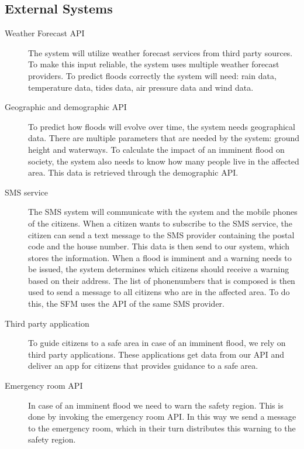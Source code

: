 \subsection{External Systems}
\label{subsec:external-system}
\begin{description}
	\item[Weather Forecast API] The system will utilize weather forecast services from third party sources. To make this input reliable, the system uses multiple weather forecast providers. To predict floods correctly the system will need: rain data, temperature data, tides data, air pressure data and wind data.
	\item[Geographic and demographic API] To predict how floods will evolve over time, the system needs geographical data. There are multiple parameters that are needed by the system: ground height and waterways. To calculate the impact of an imminent flood on society, the system also needs to know how many people live in the affected area. This data is retrieved through the demographic API.
	\item[SMS service] The SMS system will communicate with the system and the mobile phones of the citizens. When a citizen wants to subscribe to the SMS service, the citizen can send a text message to the SMS provider containing the postal code and the house number. This data is then send to our system, which stores the information. When a flood is imminent and a warning needs to be issued, the system determines which citizens should receive a warning based on their address. The list of phonenumbers that is composed is then used to send a message to all citizens who are in the affected area. To do this, the SFM uses the API of the same SMS provider.
	\item[Third party application] To guide citizens to a safe area in case of an imminent flood, we rely on third party applications. These applications get data from our API and deliver an app for citizens that provides guidance to a safe area.
	\item[Emergency room API] In case of an imminent flood we need to warn the safety region. This is done by invoking the emergency room API. In this way we send a message to the emergency room, which in their turn distributes this warning to the safety region.
\end{description}

